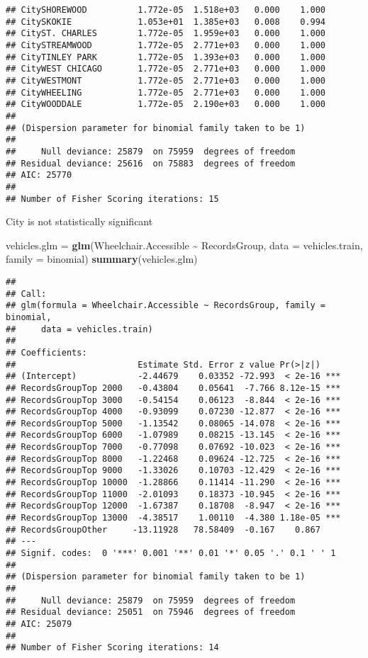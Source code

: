 \documentclass[
]{article}
\newenvironment{Shaded}{\begin{snugshade}}{\end{snugshade}}
\newcommand{\AttributeTok}[1]{\textcolor[rgb]{0.13,0.29,0.53}{#1}}
\newcommand{\FunctionTok}[1]{\textcolor[rgb]{0.13,0.29,0.53}{\textbf{#1}}}
\newcommand{\NormalTok}[1]{#1}
\newcommand{\OtherTok}[1]{\textcolor[rgb]{0.56,0.35,0.01}{#1}}
\newcommand{\SpecialCharTok}[1]{\textcolor[rgb]{0.81,0.36,0.00}{\textbf{#1}}}
\begin{document}
\begin{verbatim}
## CitySHOREWOOD          1.772e-05  1.518e+03   0.000    1.000
## CitySKOKIE             1.053e+01  1.385e+03   0.008    0.994
## CityST. CHARLES        1.772e-05  1.959e+03   0.000    1.000
## CitySTREAMWOOD         1.772e-05  2.771e+03   0.000    1.000
## CityTINLEY PARK        1.772e-05  1.393e+03   0.000    1.000
## CityWEST CHICAGO       1.772e-05  2.771e+03   0.000    1.000
## CityWESTMONT           1.772e-05  2.771e+03   0.000    1.000
## CityWHEELING           1.772e-05  2.771e+03   0.000    1.000
## CityWOODDALE           1.772e-05  2.190e+03   0.000    1.000
## 
## (Dispersion parameter for binomial family taken to be 1)
## 
##     Null deviance: 25879  on 75959  degrees of freedom
## Residual deviance: 25616  on 75883  degrees of freedom
## AIC: 25770
## 
## Number of Fisher Scoring iterations: 15
\end{verbatim}

City is not statistically significant

\begin{Shaded}
\begin{Highlighting}[]
\NormalTok{vehicles.glm }\OtherTok{=} \FunctionTok{glm}\NormalTok{(Wheelchair.Accessible }\SpecialCharTok{\textasciitilde{}}\NormalTok{ RecordsGroup, }\AttributeTok{data =}\NormalTok{ vehicles.train, }
                   \AttributeTok{family =}\NormalTok{ binomial)}
\FunctionTok{summary}\NormalTok{(vehicles.glm)}
\end{Highlighting}
\end{Shaded}

\begin{verbatim}
## 
## Call:
## glm(formula = Wheelchair.Accessible ~ RecordsGroup, family = binomial, 
##     data = vehicles.train)
## 
## Coefficients:
##                        Estimate Std. Error z value Pr(>|z|)    
## (Intercept)            -2.44679    0.03352 -72.993  < 2e-16 ***
## RecordsGroupTop 2000   -0.43804    0.05641  -7.766 8.12e-15 ***
## RecordsGroupTop 3000   -0.54154    0.06123  -8.844  < 2e-16 ***
## RecordsGroupTop 4000   -0.93099    0.07230 -12.877  < 2e-16 ***
## RecordsGroupTop 5000   -1.13542    0.08065 -14.078  < 2e-16 ***
## RecordsGroupTop 6000   -1.07989    0.08215 -13.145  < 2e-16 ***
## RecordsGroupTop 7000   -0.77098    0.07692 -10.023  < 2e-16 ***
## RecordsGroupTop 8000   -1.22468    0.09624 -12.725  < 2e-16 ***
## RecordsGroupTop 9000   -1.33026    0.10703 -12.429  < 2e-16 ***
## RecordsGroupTop 10000  -1.28866    0.11414 -11.290  < 2e-16 ***
## RecordsGroupTop 11000  -2.01093    0.18373 -10.945  < 2e-16 ***
## RecordsGroupTop 12000  -1.67387    0.18708  -8.947  < 2e-16 ***
## RecordsGroupTop 13000  -4.38517    1.00110  -4.380 1.18e-05 ***
## RecordsGroupOther     -13.11928   78.58409  -0.167    0.867    
## ---
## Signif. codes:  0 '***' 0.001 '**' 0.01 '*' 0.05 '.' 0.1 ' ' 1
## 
## (Dispersion parameter for binomial family taken to be 1)
## 
##     Null deviance: 25879  on 75959  degrees of freedom
## Residual deviance: 25051  on 75946  degrees of freedom
## AIC: 25079
## 
## Number of Fisher Scoring iterations: 14
\end{verbatim}
\end{document}
